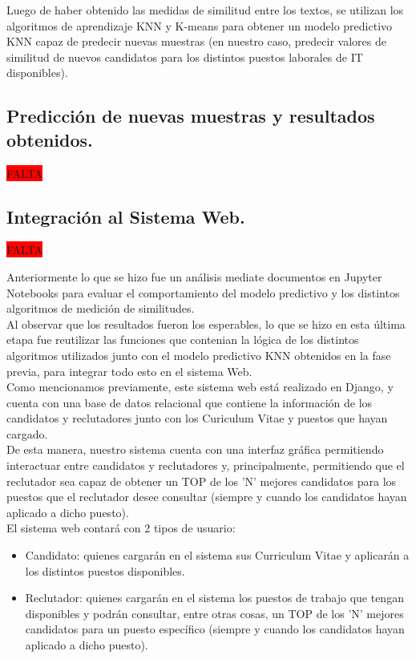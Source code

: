 \documentclass[12pt,a4paper]{article}
\begin{document}
Luego de haber obtenido las medidas de similitud entre los textos, se utilizan los algoritmos de aprendizaje KNN y K-means para obtener un modelo predictivo KNN capaz de predecir nuevas muestras (en nuestro caso, predecir valores de similitud de nuevos candidatos para los distintos puestos laborales de IT disponibles).

\cleardoublepage

\subsection{Predicción de nuevas muestras y resultados obtenidos.}\label{5.4.Predicciondenuevasmuestrasyresultadosobtenidos}

\colorbox{red}{FALTA}

\cleardoublepage

\subsection{Integración al Sistema Web.}\label{5.5.IntegracionalSistemaWeb}
\colorbox{red}{FALTA}

Anteriormente lo que se hizo fue un análisis mediate documentos en Jupyter Notebooks para evaluar el comportamiento del modelo predictivo y los distintos algoritmos de medición de similitudes. \\
Al observar que los resultados fueron los esperables, lo que se hizo en esta última etapa fue reutilizar las funciones que contenian la lógica de los distintos algoritmos utilizados junto con el modelo predictivo KNN obtenidos en la fase previa, para integrar todo esto en el sistema Web. \\
Como mencionamos previamente, este sistema web está realizado en Django, y cuenta con una base de datos relacional que contiene la información de los candidatos y reclutadores junto con los Curiculum Vitae y puestos que hayan cargado. \\
De esta manera, nuestro sistema cuenta con una interfaz gráfica permitiendo interactuar entre candidatos y reclutadores y, principalmente, permitiendo que el reclutador sea capaz de obtener un TOP de los 'N' mejores candidatos para los puestos que el reclutador desee consultar (siempre y cuando los candidatos hayan aplicado a dicho puesto).  \\

El sistema web contará con 2 tipos de usuario: 
\begin{itemize}
\item Candidato: quienes cargarán en el sistema sus Curriculum Vitae y aplicarán a los distintos puestos disponibles.
\item Reclutador: quienes cargarán en el sistema los puestos de trabajo que tengan disponibles y podrán consultar, entre otras cosas, un TOP de los 'N' mejores candidatos para un puesto específico (siempre y cuando los candidatos hayan aplicado a dicho puesto).
\end{itemize}
\end{document}
